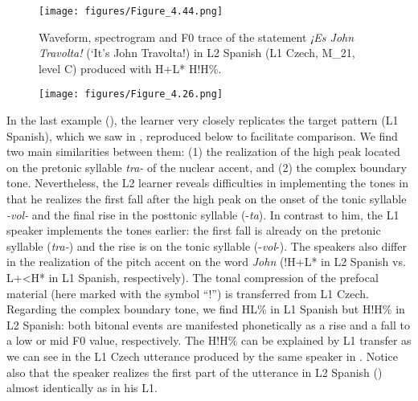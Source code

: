 \begin{figure}


\texttt{[image: figures/Figure\_4.44.png]}


\caption{Waveform, spectrogram and F0 trace of the statement \textit{¡Es John Travolta!} (‘It’s John Travolta!) in L2 Spanish (L1 Czech, M\_21, level C) produced with H+L* H!H\%.}
\label{fig:4.44}
\end{figure}



\begin{figure}


\texttt{[image: figures/Figure\_4.26.png]}


\end{figure}

In the last example (), the learner very closely replicates the target pattern (L1 Spanish), which we saw in , reproduced below to facilitate comparison.
We find two main similarities between them: (1) the realization of the high peak located on the pretonic syllable \textit{tra-} of the nuclear accent, and (2) the complex boundary tone. Nevertheless, the L2 learner reveals difficulties in implementing the tones in that he realizes the first fall after the high peak on the onset of the tonic syllable \textit{{}-vol-} and the final rise in the posttonic syllable (-\textit{ta}). In contrast to him, the L1 speaker implements the tones earlier: the first fall is already on the pretonic syllable (\textit{tra-}) and the rise is on the tonic syllable (-\textit{vol}{}-). The speakers also differ in the realization of the pitch accent on the word \textit{John} (!H+L* in L2 Spanish vs. L+<H* in L1 Spanish, respectively). The tonal compression of the prefocal material (here marked with the symbol “!”) is transferred from L1 Czech. Regarding the complex boundary tone, we find HL\% in L1 Spanish but H!H\% in L2 Spanish: both bitonal events are manifested phonetically as a rise and a fall to a low or mid F0 value, respectively. The H!H\% can be explained by L1 transfer as we can see in the L1 Czech utterance produced by the same speaker in . Notice also that the speaker realizes the first part of the utterance in L2 Spanish () almost identically as in his L1.

